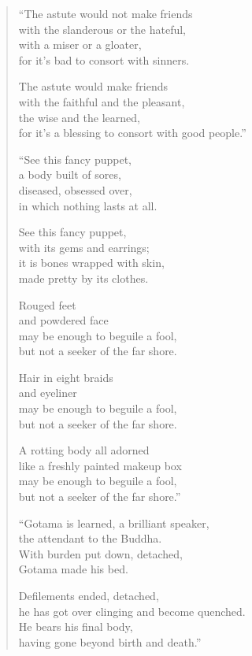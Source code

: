 \documentclass[12pt,openany]{book}%
\begin{document}
\begin{verse}%
“The astute would not make friends \\
with the slanderous or the hateful, \\
with a miser or a gloater, \\
for it’s bad to consort with sinners. 

The astute would make friends \\
with the faithful and the pleasant, \\
the wise and the learned, \\
for it’s a blessing to consort with good people.” 

“See this fancy puppet, \\
a body built of sores, \\
diseased, obsessed over, \\
in which nothing lasts at all. 

See this fancy puppet, \\
with its gems and earrings; \\
it is bones wrapped with skin, \\
made pretty by its clothes. 

Rouged feet \\
and powdered face \\
may be enough to beguile a fool, \\
but not a seeker of the far shore. 

Hair in eight braids \\
and eyeliner \\
may be enough to beguile a fool, \\
but not a seeker of the far shore. 

A rotting body all adorned \\
like a freshly painted makeup box \\
may be enough to beguile a fool, \\
but not a seeker of the far shore.” 

“Gotama is learned, a brilliant speaker, \\
the attendant to the Buddha. \\
With burden put down, detached, \\
Gotama made his bed. 

Defilements ended, detached, \\
he has got over clinging and become quenched. \\
He bears his final body, \\
having gone beyond birth and death.” 


\end{verse}
\end{document}
